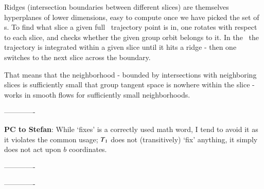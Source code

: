 Ridges (intersection boundaries between different slices) are themselves
hyperplanes of lower dimensions, easy to compute once we have picked
the set of {\template s}. To find what slice a given full \statesp\
trajectory point is in, one rotates with respect to each slice, and
checks whether the given group orbit belongs to it. In the \reducedsp\
the trajectory is integrated within a given slice until it hits a ridge -
then one switches to the next slice across the boundary.

That means that the neighborhood - bounded by intersections with
neighboring slices is sufficiently small that group tangent space is
nowhere within the slice - works in smooth flows for sufficiently small
neighborhoods.

-------------

{\bf PC to Stefan}:
	While `fixes' is a correctly used math word, I tend to avoid it 	
as it violates the common usage; $T_1$ does not (transitively) `fix'
anything, 	it simply does not act upon $b$ coordinates.

-------------


-------------

